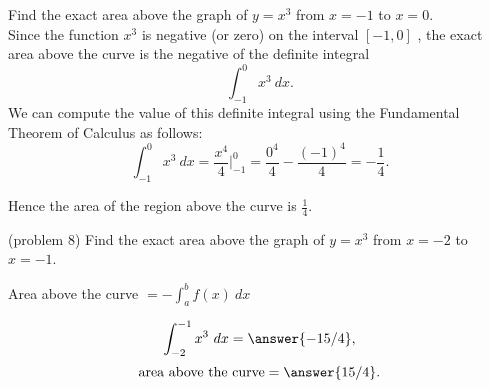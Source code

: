 \documentclass{ximera}
\begin{document}
\begin{example}[example 8]
Find the exact area above the graph of $y = x^3$ from $x = -1$ to $x = 0$. \\
Since the function $x^3$ is negative (or zero) on the interval $[-1, 0]$ , the exact area above the curve is the negative of the definite integral 
\[\int_{-1}^0 x^3 \ dx.\]
We can compute the value of this definite integral using the Fundamental Theorem of Calculus as follows:
\[\int_{-1}^0 x^3 \ dx = \frac{x^4}{4} \Big|_{-1}^0 = \frac{0^4}{4} - \frac{(-1)^4}{4} = -\frac14.\]

Hence the area of the region above the curve is $\frac14$.


\begin{image}
\end{image}
\end{example}


\begin{problem}(problem 8)
Find the exact area above the graph of $y = x^3$ from $x = -2$ to $x = -1$. \\
\begin{hint}
Area above the curve $= -\int_a^b f(x) \ dx$
\end{hint}
\[\int_{-2}^{-1} x^3 \ dx = \answer{-15/4},\]
\[\text{area above the curve} = \answer{15/4}.\]
\end{problem}
\end{document}
